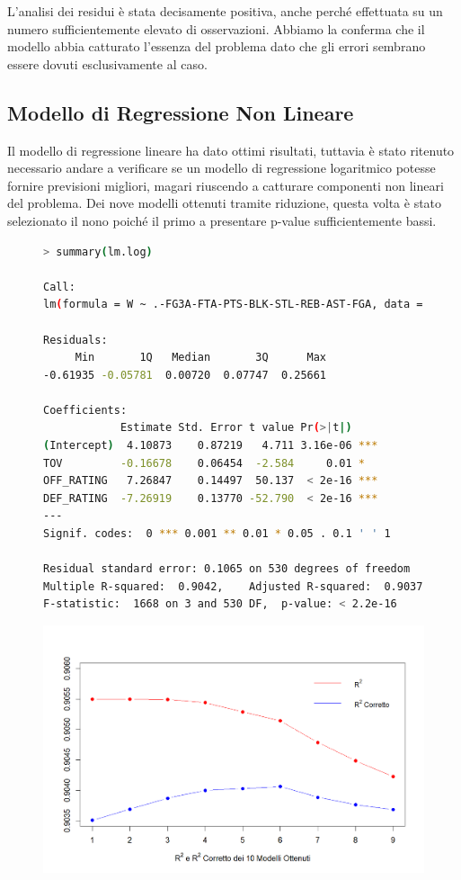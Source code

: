 \documentclass[11pt,a4paper]{article}
\begin{document}
L'analisi dei residui è stata decisamente positiva, anche perché effettuata su un numero sufficientemente elevato di osservazioni. Abbiamo la conferma che il modello abbia catturato l'essenza del problema dato che gli errori sembrano essere dovuti esclusivamente al caso.

\subsection{Modello di Regressione Non Lineare}
Il modello di regressione lineare ha dato ottimi risultati, tuttavia è stato ritenuto necessario andare a verificare se un modello di regressione logaritmico potesse fornire previsioni migliori, magari riuscendo a catturare componenti non lineari del problema. 
Dei nove modelli ottenuti tramite riduzione, questa volta è stato selezionato il nono poiché il primo a presentare p-value sufficientemente bassi.

\begin{figure}[h]
	\hspace{-2.30cm}
    \begin{minipage}{.6\textwidth} 
	\begin{lstlisting}[language=bash,basicstyle=\tiny,tabsize=2,frame = single]
> summary(lm.log)
        
Call:
lm(formula = W ~ .-FG3A-FTA-PTS-BLK-STL-REB-AST-FGA, data = ldata)
        
Residuals:
     Min       1Q   Median       3Q      Max 
-0.61935 -0.05781  0.00720  0.07747  0.25661 
        
Coefficients:
            Estimate Std. Error t value Pr(>|t|)    
(Intercept)  4.10873    0.87219   4.711 3.16e-06 ***
TOV         -0.16678    0.06454  -2.584     0.01 *  
OFF_RATING   7.26847    0.14497  50.137  < 2e-16 ***
DEF_RATING  -7.26919    0.13770 -52.790  < 2e-16 ***
---
Signif. codes:  0 *** 0.001 ** 0.01 * 0.05 . 0.1 ' ' 1
        
Residual standard error: 0.1065 on 530 degrees of freedom
Multiple R-squared:  0.9042,	Adjusted R-squared:  0.9037 
F-statistic:  1668 on 3 and 530 DF,  p-value: < 2.2e-16
	    \end{lstlisting}
    \end{minipage}
	\begin{minipage}{0.5\textwidth} 
		\includegraphics[scale=.53]{imgs/r2_log_model.png}
	\end{minipage}
\end{figure}
\end{document}
